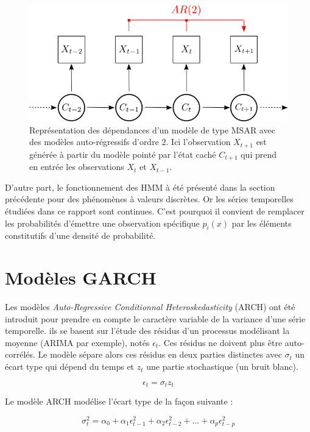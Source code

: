\documentclass[12pt]{report}
\begin{document}
\begin{figure}[ht]
	\begin{center}
		\includegraphics[width=0.6 \textwidth]{Images/Models/HMM/MSAR.png}
		\caption{Représentation des dépendances d'un modèle de type MSAR avec des modèles auto-régressifs d'ordre 2. Ici l'observation $X_{t+1}$ est générée à partir du modèle pointé par l'état caché $C_{t+1}$ qui prend en entrée les observations $X_t$ et $X_{t-1}$.}
		\label{fig::HMM:MSAR}
	\end{center}
\end{figure}


D'autre part, le fonctionnement des HMM à été présenté dans la section précédente pour des phénomènes à valeurs discrètes. Or les séries temporelles étudiées dans ce rapport sont continues. C'est pourquoi il convient de remplacer les probabilités d'émettre une observation spécifique $p_i(x)$ par les éléments constitutifs d'une densité de probabilité.


\section{Modèles GARCH}
Les modèles \textit{Auto-Regressive Conditionnal Heteroskedasticity} (ARCH) ont été introduit pour prendre en compte le caractère variable de la variance d'une série temporelle. ils se basent sur l'étude des résidus d'un processus modélisant la moyenne (ARIMA par exemple), notés $\epsilon_t$. Ces résidus ne doivent plus être auto-corrélés. Le modèle sépare alors ces résidus en deux parties distinctes avec $\sigma_t$ un écart type qui dépend du temps et $z_t$ une partie stochastique (un bruit blanc).

\begin{equation}
\epsilon_t = \sigma_t  z_t
\end{equation}

Le modèle ARCH modélise l'écart type de la façon suivante :

\begin{equation}
\sigma_t^2 = \alpha_0 + \alpha_1  \epsilon_{t-1}^2 + \alpha_2  \epsilon_{t-2}^2 + ... + \alpha_p  \epsilon_{t-p}^2 
\label{ARCH}
\end{equation}
\end{document}
